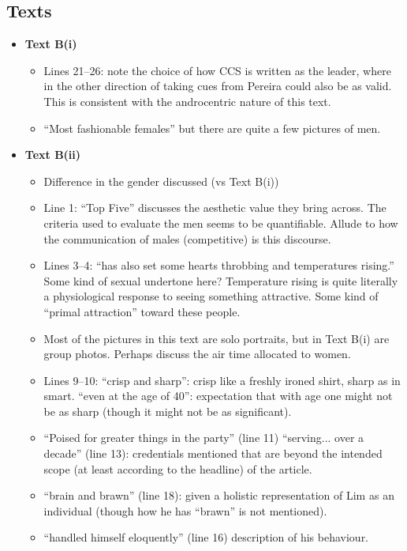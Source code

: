\documentclass[../main.tex]{subfiles}
\begin{document}
			\subsection*{Texts}
				\begin{itemize}
					\item \textbf{Text B(i)} \begin{itemize}
						\item Lines 21--26: note the choice of how CCS is written as the leader, where in the other direction of taking cues from Pereira could also be as valid. This is consistent with the androcentric nature of this text.
						\item ``Most fashionable females'' but there are quite a few pictures of men.
					\end{itemize}
				\item \textbf{Text B(ii)} \begin{itemize}
						\item Difference in the gender discussed (vs Text B(i))
						\item Line 1: ``Top Five'' discusses the aesthetic value they bring across. The criteria used to evaluate the men seems to be quantifiable. Allude to how the communication of males (competitive) is this discourse.
						\item Lines 3--4: ``has also set some hearts throbbing and temperatures rising.'' Some kind of sexual undertone here? Temperature rising is quite literally a physiological response to seeing something attractive. Some kind of ``primal attraction'' toward these people.
						\item Most of the pictures in this text are solo portraits, but in Text B(i) are group photos. Perhaps discuss the air time allocated to women.
						\item Lines 9--10: ``crisp and sharp'': crisp like a freshly ironed shirt, sharp as in smart. ``even at the age of 40'': expectation that with age one might not be as sharp (though it might not be as significant).
						\item ``Poised for greater things in the party'' (line 11) ``serving... over a decade'' (line 13): credentials mentioned that are beyond the intended scope (at least according to the headline) of the article.
						\item ``brain and brawn'' (line 18): given a holistic representation of Lim as an individual (though how he has ``brawn'' is not mentioned).
						\item ``handled himself eloquently'' (line 16) description of his behaviour. 

\end{itemize}
\end{itemize}
\end{document}
